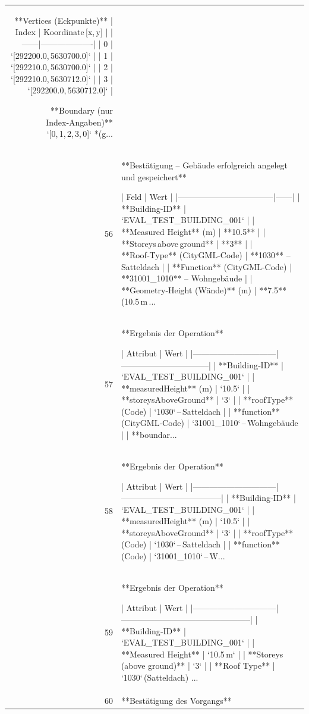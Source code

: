 \documentclass[a4paper,11pt]{article}
\begin{document}
\begin{table}[ht]
\begin{tabular}{r p{12cm}}
**Vertices (Eckpunkte)**  
| Index | Koordinate [x, y] |
|------|-------------------|
| 0 | `[292200.0, 5630700.0]` |
| 1 | `[292210.0, 5630700.0]` |
| 2 | `[292210.0, 5630712.0]` |
| 3 | `[292200.0, 5630712.0]` |

**Boundary (nur Index‑Angaben)**  
`[0, 1, 2, 3, 0]`  *(g... \\
56 & **Bestätigung – Gebäude erfolgreich angelegt und gespeichert**

| Feld                              | Wert |
|-----------------------------------|------|
| **Building‑ID**                   | `EVAL\_TEST\_BUILDING\_001` |
| **Measured Height** (m)           | **10.5** |
| **Storeys above ground**          | **3** |
| **Roof‑Type** (CityGML‑Code)      | **1030** – Satteldach |
| **Function** (CityGML‑Code)       | **31001\_1010** – Wohngebäude |
| **Geometry‑Height (Wände)** (m)   | **7.5**  (10.5 m ... \\
57 & **Ergebnis der Operation**

| Attribut                     | Wert                           |
|------------------------------|--------------------------------|
| **Building‑ID**              | `EVAL\_TEST\_BUILDING\_001`       |
| **measuredHeight** (m)       | `10.5`                         |
| **storeysAboveGround**       | `3`                            |
| **roofType** (Code)          | `1030` – Satteldach            |
| **function** (CityGML‑Code) | `31001\_1010` – Wohngebäude     |
| **boundar... \\
58 & **Ergebnis der Operation**

| Attribut                     | Wert                               |
|------------------------------|------------------------------------|
| **Building‑ID**              | `EVAL\_TEST\_BUILDING\_001`            |
| **measuredHeight** (m)       | `10.5`                              |
| **storeysAboveGround**       | `3`                                 |
| **roofType** (Code)          | `1030` – Satteldach                |
| **function** (Code)          | `31001\_1010` – W... \\
59 & **Ergebnis der Operation**

| Attribut                     | Wert                                          |
|------------------------------|-----------------------------------------------|
| **Building‑ID**              | `EVAL\_TEST\_BUILDING\_001`                      |
| **Measured Height**          | `10.5 m`                                      |
| **Storeys (above ground)**   | `3`                                           |
| **Roof Type**                | `1030` (Satteldach)               ... \\
60 & **Bestätigung des Vorgangs**


\end{tabular}
\end{table}
\end{document}
